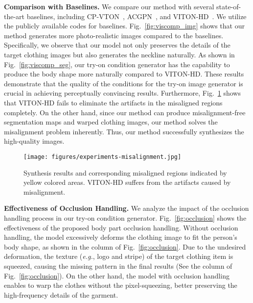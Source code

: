 \noindent\textbf{Comparison with Baselines.}
We compare our method with several state-of-the-art baselines, including CP-VTON~\cite{wang2018toward}, ACGPN~\cite{yang2020towards}, and VITON-HD~\cite{choi2021viton}.
We utilize the publicly available codes for baselines.
Fig.~\ref{fig:viscomp_img} shows that our method generates more photo-realistic images compared to the baselines.
Specifically, we observe that our model not only preserves the details of the target clothing images but also generates the neckline naturally.
As shown in Fig.~\ref{fig:viscomp_seg}, our try-on condition generator has the capability to produce the body shape more naturally compared to VITON-HD.
These results demonstrate that the quality of the conditions for the try-on image generator is crucial in achieving perceptually convincing results.
Furthermore, Fig.~\ref{fig:misalignment} shows that VITON-HD fails to eliminate the artifacts in the misaligned regions completely.
On the other hand, since our method can produce misalignment-free segmentation maps and warped clothing images, our method solves the misalignment problem inherently.
Thus, our method successfully synthesizes the high-quality images.


\begin{figure}[t!]
    \centering
    \texttt{[image: figures/experiments-misalignment.jpg]}
    \caption{Synthesis results and corresponding misaligned regions indicated by yellow colored areas. VITON-HD suffers from the artifacts caused by misalignment.}
    \label{fig:misalignment}
    \vspace{0.5cm}
\end{figure}



\noindent\textbf{Effectiveness of Occlusion Handling.}
We analyze the impact of the occlusion handling process in our try-on condition generator.
Fig.~\ref{fig:occlusion} shows the effectiveness of the proposed body part occlusion handling. 
Without occlusion handling, the model excessively deforms the clothing image to fit the person's body shape, as shown in the  column of Fig.~\ref{fig:occlusion}.
Due to the undesired deformation, the texture (\textit{e.g.}, logo and stripe) of the target clothing item is squeezed, causing the missing pattern in the final results (See the  column of Fig.~\ref{fig:occlusion}).
On the other hand, the model with occlusion handling enables to warp the clothes without the pixel-squeezing, better preserving the high-frequency details of the garment.


